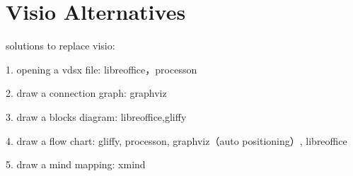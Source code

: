 \section{Visio Alternatives}


solutions to replace visio:


1. opening a vdsx file: libreoffice，processon

2. draw a connection graph: graphviz

3. draw a blocks diagram: libreoffice,gliffy

4. draw a flow chart: gliffy, processon, graphviz（auto positioning）, libreoffice

5. draw a mind mapping: xmind
